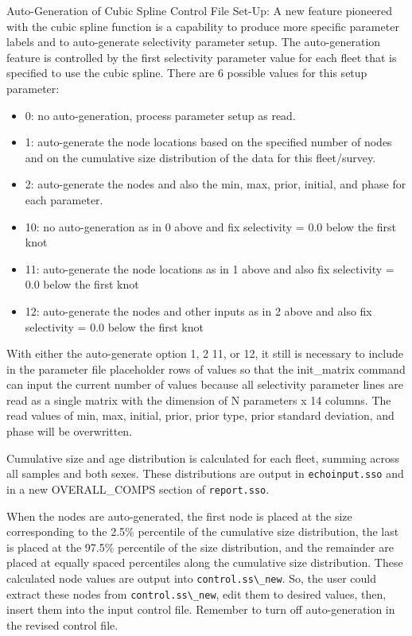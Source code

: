 Auto-Generation of Cubic Spline Control File Set-Up: A new feature pioneered with the cubic spline function is a capability to produce more specific parameter labels and to auto-generate selectivity parameter setup. The auto-generation feature is controlled by the first selectivity parameter value for each fleet that is specified to use the cubic spline. There are 6 possible values for this setup parameter:
	\begin{itemize}
		\item 0: no auto-generation, process parameter setup as read.
		\item 1: auto-generate the node locations based on the specified number of nodes and on the cumulative size distribution of the data for this fleet/survey.
		\item 2: auto-generate the nodes and also the min, max, prior, initial, and phase for each parameter. 
		\item 10: no auto-generation as in 0 above and fix selectivity = 0.0 below the first knot
		\item 11: auto-generate the node locations as in 1 above and also fix selectivity = 0.0 below the first knot
		\item 12: auto-generate the nodes and other inputs as in 2 above and also fix selectivity = 0.0 below the first knot 
	\end{itemize}
	
With either the auto-generate option 1, 2 11, or 12, it still is necessary to include in the parameter file placeholder rows of values so that the init\_matrix command can input the current number of values because all selectivity parameter lines are read as a single matrix with the dimension of N parameters x 14 columns. The read values of min, max, initial, prior, prior type, prior standard deviation, and phase will be overwritten.
	
Cumulative size and age distribution is calculated for each fleet, summing across all samples and both sexes. These distributions are output in \verb|echoinput.sso| and in a new OVERALL\_COMPS section of \verb|report.sso|.
	
When the nodes are auto-generated, the first node is placed at the size corresponding to the 2.5\% percentile of the cumulative size distribution, the last is placed at the 97.5\% percentile of the size distribution, and the remainder are placed at equally spaced percentiles along the cumulative size distribution. These calculated node values are output into \verb|control.ss\_new|. So, the user could extract these nodes from \verb|control.ss\_new|, edit them to desired values, then, insert them into the input control file. Remember to turn off auto-generation in the revised control file.
	
